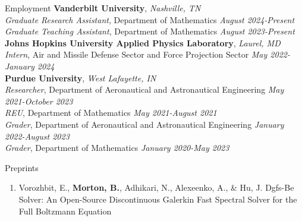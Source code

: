 \documentclass{CV} %
\begin{document}

\begin{rSection}{Employment}
    \textbf{Vanderbilt University}, \textit{Nashville, TN} \\
    \textit{Graduate Research Assistant}, Department of Mathematics \hfill \textit{August 2024-Present} \\ 
    \textit{Graduate Teaching Assistant}, Department of Mathematics \hfill \textit{August 2023-Present}\\ 
    \newline 
    \textbf{Johns Hopkins University Applied Physics Laboratory}, \textit{Laurel, MD} \\
    \textit{Intern}, Air and Missile Defense Sector and Force Projection Sector \hfill \textit{May 2022-January 2024}\\ 
    \newline 
    \textbf{Purdue University}, \textit{West Lafayette, IN} \\ 
    \textit{Researcher}, Department of Aeronautical and Astronautical Engineering \hfill \textit{May 2021-October 2023} \\ 
    \textit{REU}, Department of Mathematics \hfill \textit{May 2021-August 2021} \\ 
    \textit{Grader}, Department of Aeronautical and Astronautical Engineering \hfill \textit{January 2022-August 2023} \\ 
    \textit{Grader}, Department of Mathematics \hfill \textit{January 2020-May 2023}
\end{rSection}

\begin{rSection}{Preprints}
    \begin{enumerate}
        \item Vorozhbit, E., \textbf{Morton, B.}, Adhikari, N., Alexeenko, A., \& Hu, J. Dgfs-Be Solver: An Open-Source Discontinuous Galerkin Fast Spectral Solver for the Full Boltzmann Equation
    \end{enumerate}
\end{rSection}
\newpage
\end{document}
